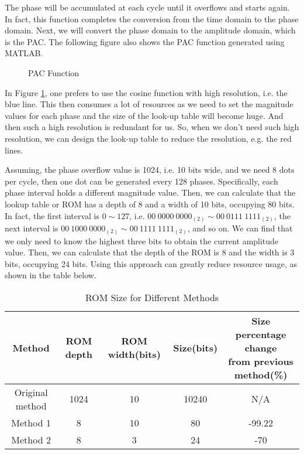 The phase will be accumulated at each cycle until it overflows and starts again. In fact, this function completes the conversion from the time domain to the phase domain. Next, we will convert the phase domain to the amplitude domain, which is the PAC. The following figure also shows the PAC function generated using MATLAB.

\begin{figure}[!htbp]
    \centering
    
    \caption{PAC Function}
    \label{fig:PAC_function}
\end{figure}

In Figure \ref{fig:PAC_function}, one prefers to use the cosine function with high resolution, i.e. the blue line. This then consumes a lot of resources as we need to set the magnitude values for each phase and the size of the look-up table will become huge. And then such a high resolution is redundant for us. So, when we don't need such high resolution, we can  design the look-up table to reduce the resolution, e.g. the red lines.

Assuming, the phase overflow value is \num{1024}, i.e. 10 bits wide, and we need 8 dots per cycle, then one dot can be generated every 128 phases. Specifically, each phase interval holds a different magnitude value. Then, we can calculate that the lookup table or ROM has a depth of 8 and a width of 10 bits, occupying 80 bits.
In fact, the first interval is $0\sim127$, i.e. $00\ 0000\ 0000_{(2)}\sim00\  0111\ 1111_{(2)}$, the next interval is $00\ 1000\ 0000_{(2)}\sim00\ 1111\ 1111_{(2)}$, and so on. We can find that we only need to know the highest three bits to obtain the current amplitude value. Then, we can calculate that the depth of the ROM is 8 and the width is 3 bits, occupying 24 bits. Using this approach can greatly reduce resource usage, as shown in the table below.

\begin{table}[!htbp]
\centering
\caption{ROM Size for Different Methods}\label{tab:rom_size}
\renewcommand\arraystretch{1.5}
\begin{tabular}{ccccc}
    \toprule
    Method & ROM depth & ROM width(bits) & Size(bits) & \thead{Size percentage change\\from previous method(\%)} \\
    \midrule
    Original method & \num{1024} & 10 & \num{10240} & N/A \\
    Method 1 & 8 & 10 & 80 & -99.22 \\
    Method 2 & 8 & 3 & 24 & -70 \\
    \bottomrule
\end{tabular}
\end{table}

